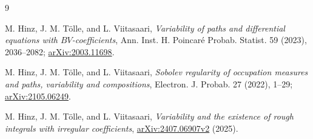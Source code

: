 \documentclass[11pt]{article}
\begin{document}
\begin{thebibliography}{9}

M. Hinz, J. M. T\"olle, and L. Viitasaari,
\emph{Variability of paths and differential equations with
$BV$-coefficients}, Ann. Inst. H. Poincar\'e Probab. Statist. 59 (2023),
2036--2082; \href{https://arxiv.org/abs/2003.11698}{arXiv:2003.11698}.

M. Hinz, J. M. T\"olle, and L. Viitasaari,
\emph{Sobolev regularity of occupation measures and paths, variability and
compositions}, Electron. J. Probab. 27 (2022), 1--29;
\href{https://arxiv.org/abs/2105.06249}{arXiv:2105.06249}.

M. Hinz, J. M. T\"olle, and L. Viitasaari,
\emph{Variability and the existence of rough integrals with irregular
coefficients}, \href{https://arxiv.org/abs/2407.06907}{arXiv:2407.06907v2}
(2025).

\end{thebibliography}
\end{document}

